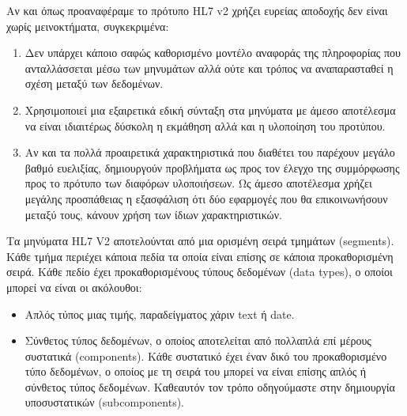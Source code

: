 		Αν και όπως προαναφέραμε το πρότυπο HL7 v2 χρήζει ευρείας αποδοχής δεν είναι χωρίς μεινοκτήματα, συγκεκριμένα\cite{bourquard2015standards}:
		\begin{enumerate}
			\item Δεν υπάρχει κάποιο σαφώς καθορισμένο μοντέλο αναφοράς της πληροφορίας που ανταλλάσσεται μέσω των μηνυμάτων αλλά ούτε και τρόπος να αναπαρασταθεί η σχέση μεταξύ των δεδομένων.
			\item Χρησιμοποιεί μια εξαιρετικά εδική σύνταξη στα μηνύματα με άμεσο αποτέλεσμα να είναι ιδιαιτέρως δύσκολη η εκμάθηση αλλά και η υλοποίηση του προτύπου.
			\item Αν και τα πολλά προαιρετικά χαρακτηριστικά που διαθέτει του παρέχουν μεγάλο βαθμό ευελιξίας, δημιουργούν προβλήματα ως προς τον έλεγχο της συμμόρφωσης προς το πρότυπο των διαφόρων υλοποιήσεων. Ως άμεσο αποτέλεσμα χρήζει μεγάλης προσπάθειας η εξασφάλιση ότι δύο εφαρμογές που θα επικοινωνήσουν μεταξύ τους, κάνουν χρήση των ίδιων χαρακτηριστικών.
		\end{enumerate}
		
		Τα μηνύματα HL7 V2 αποτελούνται από μια ορισμένη σειρά τμημάτων (segments). Κάθε τμήμα περιέχει κάποια πεδία τα οποία είναι επίσης σε κάποια προκαθορισμένη σειρά. Κάθε πεδίο έχει προκαθορισμένους τύπους δεδομένων (data types), ο οποίοι μπορεί να είναι οι ακόλουθοι\cite{dolin2001hl7}:
		\begin{itemize}
			\item Απλός τύπος μιας τιμής, παραδείγματος χάριν text ή date.
			\item Σύνθετος τύπος δεδομένων, ο οποίος αποτελείται από πολλαπλά επί μέρους συστατικά (components). Κάθε συστατικό έχει έναν δικό του προκαθορισμένο τύπο δεδομένων, ο οποίος με τη σειρά του μπορεί να είναι επίσης απλός ή σύνθετος τύπος δεδομένων. Καθεαυτόν τον τρόπο οδηγούμαστε στην δημιουργία υποσυστατικών (subcomponents).
		\end{itemize}
		
